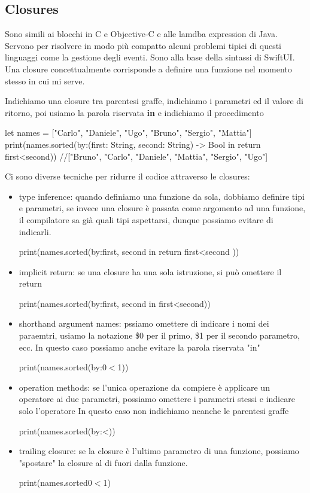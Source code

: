 \subsection{Closures}
Sono simili ai blocchi in C e Objective-C e alle lamdba expression di Java. 
Servono per risolvere in modo più compatto alcuni problemi tipici di questi linguaggi come la gestione degli eventi.
Sono alla base della sintassi di SwiftUI.
Una closure concettualmente corrisponde a definire una funzione nel momento stesso in cui mi serve.

Indichiamo una closure tra parentesi graffe, indichiamo i parametri ed il valore di ritorno, poi usiamo la parola riservata \textbf{in} e indichiamo il procedimento
\begin{Swift}
    let names = ["Carlo", "Daniele", "Ugo", "Bruno", "Sergio",
    "Mattia"]
    print(names.sorted(by:{(first: String, second: String) -> 
                            Bool in
        return first<second}))
    //["Bruno", "Carlo", "Daniele", "Mattia", "Sergio", "Ugo"]
\end{Swift}

Ci sono diverse tecniche per ridurre il codice attraverso le closures:
\begin{itemize}
    \item type inference: quando definiamo una funzione da sola, dobbiamo definire tipi e parametri, se invece una closure è passata come argomento ad una funzione, il compilatore sa già quali tipi aspettarsi, dunque possiamo evitare di indicarli. 
    \begin{Swift}
    print(names.sorted(by:{first, second in
        return first<second
    }))
\end{Swift}
    \item implicit return: se una closure ha una sola istruzione, si può omettere il return
    \begin{Swift} 
        print(names.sorted(by:{first, second in 
                                first<second}))
    \end{Swift}
    \item shorthand argument names: pssiamo omettere di indicare i nomi dei paraemtri, usiamo la notazione \$0 per il primo, \$1 per il secondo parametro, ecc.
    In questo caso possiamo anche evitare la parola riservata "in"
    \begin{Swift}
        print(names.sorted(by:{$0<$1}))
    \end{Swift}
    \item operation methods: se l'unica operazione da compiere è applicare un operatore ai due parametri, possiamo omettere i parametri stessi e indicare solo l'operatore
    In questo caso non indichiamo neanche le parentesi graffe
    \begin{Swift}
        print(names.sorted(by:<))
    \end{Swift}
    \item trailing closure: se la closure è l'ultimo parametro di una funzione, possiamo "spostare" la closure al di fuori dalla funzione. 
    \begin{Swift}
        print(names.sorted{$0<$1})
    \end{Swift}
\end{itemize}

